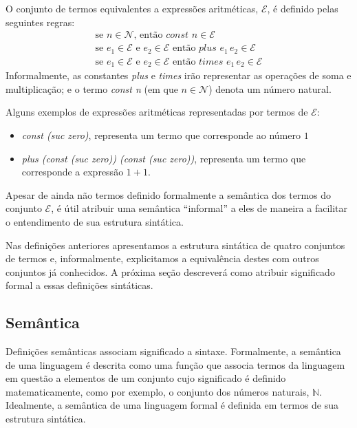 \begin{Definition}\label{def:arithexp}
  O conjunto de termos equivalentes a express\~oes aritm\'eticas, $\mathcal{E}$, \'e definido pelas seguintes regras:
  \[
  \begin{array}{l}
    \text{se }n\in\mathcal{N}\text{, ent\~ao } \textit{const }n\in\mathcal{E}\\
    \text{se }e_1 \in \mathcal{E} \text{ e } e_2 \in \mathcal{E}\text{ ent\~ao }\textit{plus }e_1\,e_2\in\mathcal{E}\\
    \text{se }e_1 \in \mathcal{E} \text{ e } e_2 \in \mathcal{E}\text{ ent\~ao }\textit{times }e_1\,e_2\in\mathcal{E}
  \end{array}
  \]
  Informalmente, as constantes \textit{plus} e \textit{times} ir\~ao representar as opera\c{c}\~oes de soma e multiplica\c{c}\~ao; e
  o termo \textit{const n} (em que $n\in\mathcal{N}$) denota um n\'umero natural.
\end{Definition}

\begin{Example}
  Alguns exemplos de express\~oes aritm\'eticas representadas por termos de $\mathcal{E}$:
  \begin{itemize}
    \item \textit{const (suc zero)}, representa um termo que corresponde ao n\'umero $1$
    \item \textit{plus (const (suc zero)) (const (suc zero))}, representa um termo que corresponde a express\~ao $1 + 1$.
  \end{itemize}
  Apesar de ainda n\~ao termos definido formalmente a sem\^antica dos termos do conjunto $\mathcal{E}$, \'e \'util atribuir 
  uma sem\^antica ``informal'' a eles de maneira a facilitar o entendimento de sua estrutura sint\'atica.
\end{Example}

Nas defini\c{c}\~oes anteriores apresentamos a estrutura sint\'atica de quatro conjuntos de termos e, informalmente, explicitamos a equival\^encia
destes com outros conjuntos j\'a conhecidos. A pr\'oxima se\c{c}\~ao descrever\'a como atribuir significado formal 
a essas defini\c{c}\~oes sint\'aticas.

\subsection{Sem\^antica}\label{cap1:sem}

Defini\c{c}\~oes sem\^anticas associam significado a sintaxe. Formalmente, a sem\^antica de uma linguagem \'e descrita como
uma fun\c{c}\~ao que associa termos da linguagem em quest\~ao a elementos de um conjunto cujo significado \'e definido
matematicamente, como por exemplo, o conjunto dos n\'umeros naturais, $\mathbb{N}$. Idealmente, a sem\^antica de uma linguagem formal
\'e definida em termos de sua estrutura sint\'atica.


